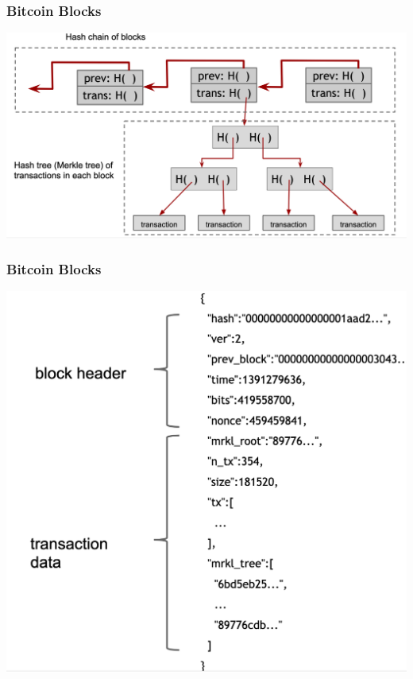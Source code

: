 \documentclass{beamer}
\begin{document}
\begin{frame}
  \frametitle{Bitcoin Blocks}
  
  \centering
	\includegraphics[scale=0.29]{blockchain}
  
\end{frame}
\begin{frame}
  \frametitle{Bitcoin Blocks}
  
  \centering
	\includegraphics[scale=0.3]{block1}
  
\end{frame}
\end{document}
